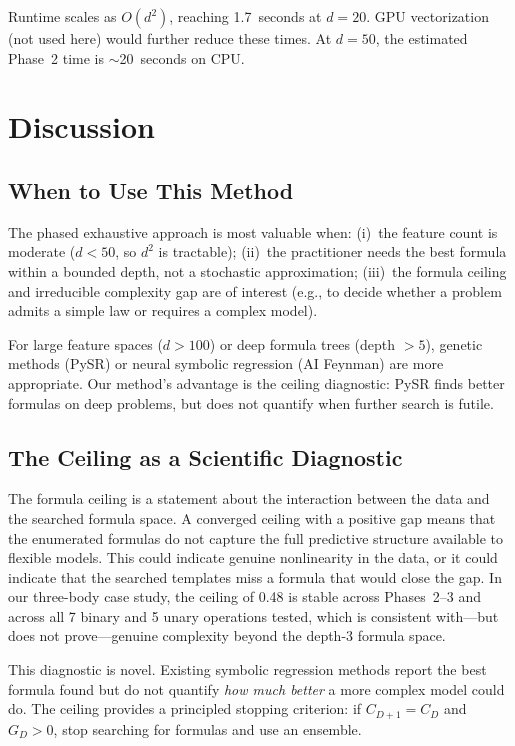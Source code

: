 \documentclass[journal]{IEEEtran}
\begin{document}
Runtime scales as $O(d^2)$, reaching 1.7~seconds at $d = 20$.
GPU vectorization (not used here) would further reduce these times.
At $d = 50$, the estimated Phase~2 time is $\sim$20~seconds on CPU.

\section{Discussion}

\subsection{When to Use This Method}

The phased exhaustive approach is most valuable when:
(i)~the feature count is moderate ($d < 50$, so $d^2$ is tractable);
(ii)~the practitioner needs the best formula within a bounded depth,
not a stochastic approximation;
(iii)~the formula ceiling and irreducible complexity gap are of
interest (e.g., to decide whether a problem admits a simple law or
requires a complex model).

For large feature spaces ($d > 100$) or deep formula trees
(depth $> 5$), genetic methods (PySR) or neural symbolic regression
(AI Feynman) are more appropriate. Our method's advantage is the
ceiling diagnostic: PySR finds better formulas on deep problems,
but does not quantify when further search is futile.

\subsection{The Ceiling as a Scientific Diagnostic}

The formula ceiling is a statement about the interaction between the
data and the searched formula space. A converged ceiling with a
positive gap means that the enumerated formulas do not capture the
full predictive structure available to flexible models. This could
indicate genuine nonlinearity in the data, or it could indicate that
the searched templates miss a formula that would close the gap. In
our three-body case study, the ceiling of 0.48 is stable across
Phases~2--3 and across all 7 binary and 5 unary operations tested,
which is consistent with---but does not prove---genuine complexity
beyond the depth-3 formula space.

This diagnostic is novel. Existing symbolic regression methods report
the best formula found but do not quantify \emph{how much better}
a more complex model could do. The ceiling provides a principled
stopping criterion: if $C_{D+1} = C_D$ and $G_D > 0$, stop searching
for formulas and use an ensemble.
\end{document}
